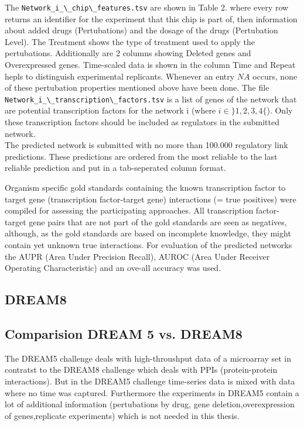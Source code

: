The \texttt{Network{\_}i{\_}\textbackslash{\_}chip\textbackslash{\_}features.tsv} are shown in Table 2. where every row returns an identifier for the experiment that this chip is part of, then information about added drugs (Pertubations) and the dosage of the drugs (Pertubation Level). The Treatment shows the type of treatment used to apply the pertubations. Additionally are 2 columns showing Deleted genes and Overexpressed genes. Time-scaled data is shown in the column Time and Repeat hepls to distinguish experimental replicants. Whenever an entry $NA$ occurs, none of these pertubation properties mentioned above have been done.
The file \texttt{Network{\_}i{\_}\textbackslash{\_}transcription\textbackslash{\_}factors.tsv} is a list of genes of the network that are potential transcription factors for the network i (where $i\in \rbrace 1,2,3,4\lbrace$). Only these transcription factors should be included as regulators in the submitted network.\\

The predicted network is submitted with no more than 100.000 regulatory link predictions. These predictions are ordered from the most reliable to the last reliable prediction and put in a tab-seperated column format.


Organism specific gold standards containing the known transcription factor to target gene (transcription factor-target gene) interactions (= true positives) were compiled for assessing the participating approaches. All transcription factor-target gene pairs that are not part of the gold standards are seen as negatives, although, as the gold standards are based on incomplete knowledge, they might contain yet unknown true interactions. For evaluation of the predicted networks the AUPR (Area Under Precision Recall), AUROC (Area Under Receiver Operating Characteristic) and an ove-all accuracy was used.





\subsection{DREAM8}





\subsection{Comparision DREAM 5 vs. DREAM8}
The DREAM5 challenge deals with high-throushput data of a microarray set in contratst to the DREAM8 challenge which deals with PPIs (protein-protein interactions). But in the DREAM5 challenge time-series data is mixed with data where no time was captured. Furthermore the experiments in DREAM5 contain a lot of additional information (pertubations by drug, gene deletion,overexpression of genes,replicate experiments) which is not needed in this thesis. 

